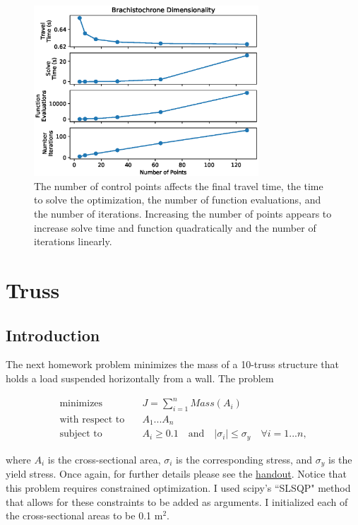 \documentclass{article}
\begin{document}
\begin{figure}[htbp]
	\centering
	\includegraphics[width=0.75\textwidth]{figures/dimensionality.eps}
	\caption{The number of control points affects the final travel time, the time to solve the optimization, the number of function evaluations, and the number of iterations. Increasing the number of points appears to increase solve time and function quadratically and the number of iterations linearly.}
	\label{fig:dimensionality}
\end{figure}




\section{Truss}

\subsection{Introduction}

The next homework problem minimizes the mass of a 10-truss structure that holds a load suspended horizontally from a wall. The problem 

\begin{equation*}
\begin{aligned}
\text{minimizes} & \quad J= \sum_{i=1}^{n} Mass(A_i) \\
\text{with respect to} & \quad A_1 ... A_{n} \\
\text{subject to} & \quad A_i \ge 0.1 \quad \text{and} \quad | \sigma_i | \le \sigma_y \quad \forall i=1 ... n,
\end{aligned}
\end{equation*}

where $A_i$ is the cross-sectional area, $\sigma_i$ is the corresponding stress, and $\sigma_y$ is the yield stress. Once again, for further details please see the \href{https://byu.box.com/shared/static/iig80eoctek0lrs60avsmjxndc9sgk2m.pdf}{handout}. Notice that this problem requires constrained optimization. I used scipy's ``SLSQP" method that allows for these constraints to be added as arguments. I initialized each of the cross-sectional areas to be 0.1 m$^2$.
\end{document}
